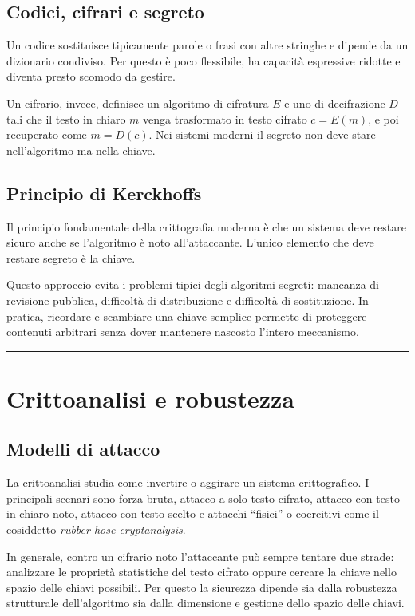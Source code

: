 \documentclass[12pt, a4paper]{report}
\begin{document}
\subsection{Codici, cifrari e segreto}
Un codice sostituisce tipicamente parole o frasi con altre stringhe e dipende da un dizionario condiviso. Per questo è poco flessibile, ha capacità espressive ridotte e diventa presto scomodo da gestire.

Un cifrario, invece, definisce un algoritmo di cifratura $E$ e uno di decifrazione $D$ tali che il testo in chiaro $m$ venga trasformato in testo cifrato $c = E(m)$, e poi recuperato come $m = D(c)$. Nei sistemi moderni il segreto non deve stare nell'algoritmo ma nella chiave.

\subsection{Principio di Kerckhoffs}
Il principio fondamentale della crittografia moderna è che un sistema deve restare sicuro anche se l'algoritmo è noto all'attaccante. L'unico elemento che deve restare segreto è la chiave.

Questo approccio evita i problemi tipici degli algoritmi segreti: mancanza di revisione pubblica, difficoltà di distribuzione e difficoltà di sostituzione. In pratica, ricordare e scambiare una chiave semplice permette di proteggere contenuti arbitrari senza dover mantenere nascosto l'intero meccanismo.

\noindent\rule{\textwidth}{0.4pt}

\section{Crittoanalisi e robustezza}

\subsection{Modelli di attacco}
La crittoanalisi studia come invertire o aggirare un sistema crittografico. I principali scenari sono forza bruta, attacco a solo testo cifrato, attacco con testo in chiaro noto, attacco con testo scelto e attacchi ``fisici'' o coercitivi come il cosiddetto \textit{rubber-hose cryptanalysis}.

In generale, contro un cifrario noto l'attaccante può sempre tentare due strade: analizzare le proprietà statistiche del testo cifrato oppure cercare la chiave nello spazio delle chiavi possibili. Per questo la sicurezza dipende sia dalla robustezza strutturale dell'algoritmo sia dalla dimensione e gestione dello spazio delle chiavi.
\end{document}
